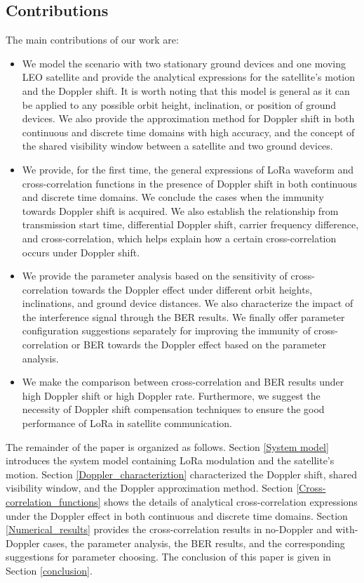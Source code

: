 \documentclass{IEEEtaes}
\theoremstyle{plain}
\begin{document}
\subsection{Contributions}
The main contributions of our work are: 

\begin{itemize}
\item We model the scenario with two stationary ground devices and one moving LEO satellite and provide the analytical expressions for the satellite's motion and the Doppler shift. It is worth noting that this model is general as it can be applied to any possible orbit height, inclination, or position of ground devices. We also provide the approximation method for Doppler shift in both continuous and discrete time domains with high accuracy, and the concept of the shared visibility window between a satellite and two ground devices.
\item We provide, for the first time, the general expressions of LoRa waveform and cross-correlation functions in the presence of Doppler shift in both continuous and discrete time domains. We conclude the cases when the immunity towards Doppler shift is acquired. We also establish the relationship from transmission start time, differential Doppler shift, carrier frequency difference, and cross-correlation, which helps explain how a certain cross-correlation occurs under Doppler shift.
\item We provide the parameter analysis based on the sensitivity of cross-correlation towards the Doppler effect under different orbit heights, inclinations, and ground device distances. We also characterize the impact of the interference signal through the BER results. We finally offer parameter configuration suggestions separately for improving the immunity of cross-correlation or BER towards the Doppler effect based on the parameter analysis.
\item We make the comparison between cross-correlation and BER results under high Doppler shift or high Doppler rate. Furthermore, we suggest the necessity of Doppler shift compensation techniques to ensure the good performance of LoRa in satellite communication.
\end{itemize}

The remainder of the paper is organized as follows. Section \ref{System model} introduces the system model containing LoRa modulation and the satellite's motion. Section \ref{Doppler_characteriztion} characterized the Doppler shift, shared visibility window, and the Doppler approximation method. Section \ref{Cross-correlation_functions} shows the details of analytical cross-correlation expressions under the Doppler effect in both continuous and discrete time domains. Section \ref{Numerical_results} provides the cross-correlation results in no-Doppler and with-Doppler cases, the parameter analysis, the BER results, and the corresponding suggestions for parameter choosing. The conclusion of this paper is given in Section \ref{conclusion}.
\end{document}
